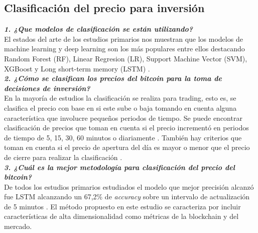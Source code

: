 \subsection{Clasificación del precio para inversión}

\textbf{\textit{1. ¿Que modelos de clasificación se están utilizando?}}\\
El estados del arte de los estudios primarios nos muestran que los modelos de machine learning y deep learning son los más populares entre ellos destacando Random Forest (RF), Linear Regresion (LR), Support Machine Vector (SVM), XGBoost y Long short-term memory (LSTM) \cite{ibrahimPredictingMarketMovement2021, jaquartShorttermBitcoinMarket2021,chenBitcoinPricePrediction2020,akyildirimPredictionCryptocurrencyReturns2021,pintelasInvestigatingProblemCryptocurrency2020}.\\

\textbf{\textit{2. ¿Cómo se clasifican los precios del bitcoin para la toma de decisiones de inversión?}}\\
En la mayoría de estudios la clasificación se realiza para trading, esto es, se clasifica el precio con base en si este sube o baja tomando en cuenta alguna característica que involucre pequeños periodos de tiempo. Se puede encontrar clasificación de precios que toman en cuenta si el precio incrementó en periodos de tiempo de 5, 15, 30, 60 minutos o diariamente \cite{ibrahimPredictingMarketMovement2021, jaquartShorttermBitcoinMarket2021,chenBitcoinPricePrediction2020,pintelasInvestigatingProblemCryptocurrency2020}. También hay criterios que toman en cuenta si el precio de apertura del día es mayor o menor que el precio de cierre para realizar la clasificación \cite{akyildirimPredictionCryptocurrencyReturns2021}.\\

\textbf{\textit{3. ¿Cuál es la mejor metodología para clasificación del precio del bitcoin?}}\\
De todos los estudios primarios estudiados el modelo que mejor precisión alcanzó fue LSTM alcanzando un 67,2\% de \textit{accuracy} sobre un intervalo de actualización de 5 minutos \cite{chenBitcoinPricePrediction2020}. El método propuesto en este estudio se caracteriza por incluir características de alta dimensionalidad como métricas de la blockchain y del mercado.\\






